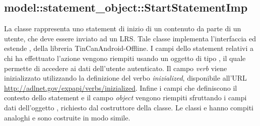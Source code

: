\documentclass[../Tesi.tex]{subfiles}
\begin{document}
		\subsection{model::statement\_object::StartStatementImp}
		La classe  rappresenta uno statement di inizio di un contenuto da parte di un utente, che deve essere inviato ad un LRS. Tale classe implementa l'interfaccia  ed estende , della libreria TinCanAndroid-Offline. I campi dello statement relativi a chi ha effettuato l'azione vengono riempiti usando un oggetto di tipo , il quale permette di accedere ai dati dell'utente autenticato. Il campo \textit{verb} viene inizializzato utilizzando la definizione del verbo \textit{inizialized}, disponibile all'URL \url{http://adlnet.gov/expapi/verbs/inizialized}. Infine i campi che definiscono il contesto dello statement e il campo \textit{object} vengono riempiti sfruttando i campi dati dell'oggetto , richiesto dal costruttore della classe. Le classi  e  hanno compiti analoghi e sono costruite in modo simile.
\end{document}
